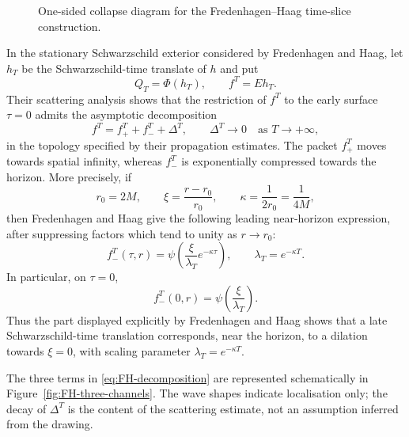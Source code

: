 \documentclass[11pt,a4paper]{article}
\theoremstyle{definition}
\theoremstyle{remark}
\begin{document}
\begin{figure}[htbp]
		\caption{One-sided collapse diagram for the Fredenhagen--Haag time-slice
			construction.}
		\label{fig:FH-collapse-detector}
	\end{figure}
	
	In the stationary Schwarzschild exterior considered by Fredenhagen and Haag,
	let $h_T$ be the Schwarzschild-time translate of $h$ and put
	\[
	Q_T=\Phi(h_T),
	\qquad
	f^T=Eh_T.
	\]
	Their scattering analysis shows that the restriction of $f^T$ to the early
	surface $\tau=0$ admits the asymptotic decomposition
	\begin{equation}
		f^T=f_+^T+f_-^T+\Delta^T,
		\qquad
		\Delta^T\longrightarrow0
		\quad\text{as }T\longrightarrow+\infty,
		\label{eq:FH-decomposition}
	\end{equation}
	in the topology specified by their propagation estimates.  The packet
	$f_+^T$ moves towards spatial infinity, whereas $f_-^T$ is exponentially
	compressed towards the horizon.  More precisely, if
	\[
	r_0=2M,
	\qquad
	\xi=\frac{r-r_0}{r_0},
	\qquad
	\kappa=\frac{1}{2r_0}=\frac{1}{4M},
	\]
	then Fredenhagen and Haag give the following leading near-horizon expression,
	after suppressing factors which tend to unity as $r\to r_0$:
	\begin{equation}
		f_-^T(\tau,r)
		=
		\psi\left(
		\frac{\xi}{\lambda_T}e^{-\kappa\tau}
		\right),
		\qquad
		\lambda_T=e^{-\kappa T}.
		\label{eq:FH-dilation}
	\end{equation}
	In particular, on $\tau=0$,
	\[
	f_-^T(0,r)
	=
	\psi\left(\frac{\xi}{\lambda_T}\right).
	\]
	Thus the part displayed explicitly by Fredenhagen and Haag shows that a late
	Schwarzschild-time translation corresponds, near the horizon, to a dilation
	towards $\xi=0$, with scaling parameter
	$\lambda_T=e^{-\kappa T}$.
	
	The three terms in \eqref{eq:FH-decomposition} are represented schematically
	in Figure~\ref{fig:FH-three-channels}.  The wave shapes indicate localisation
	only; the decay of $\Delta^T$ is the content of the scattering estimate, not
	an assumption inferred from the drawing.
	
\end{document}

